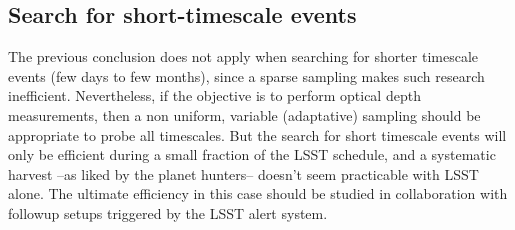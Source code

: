\subsection{Search for short-timescale events}
    
    The previous conclusion does not apply when searching for shorter timescale events (few days to few months), since a sparse sampling makes such research inefficient. Nevertheless, if the objective is to perform optical depth measurements, then a non uniform, variable (adaptative) sampling should be appropriate to probe all timescales. But the search for short timescale events will only be efficient during a small fraction of the LSST schedule, and a systematic harvest --as liked by the planet hunters-- doesn't seem practicable with LSST alone. The ultimate efficiency in this case should be studied in collaboration with followup setups triggered by the LSST alert system.
